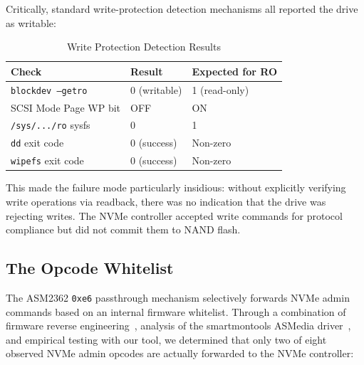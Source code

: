 \documentclass[conference]{IEEEtran}
\begin{document}
Critically, standard write-protection detection mechanisms all reported
the drive as writable:

\begin{table}[ht]
\centering
\caption{Write Protection Detection Results}
\label{tab:wp-detection}
\begin{tabular}{@{}lll@{}}
\toprule
Check & Result & Expected for RO \\
\midrule
\texttt{blockdev --getro} & 0 (writable) & 1 (read-only) \\
SCSI Mode Page WP bit & OFF & ON \\
\texttt{/sys/.../ro} sysfs & 0 & 1 \\
\texttt{dd} exit code & 0 (success) & Non-zero \\
\texttt{wipefs} exit code & 0 (success) & Non-zero \\
\bottomrule
\end{tabular}
\end{table}

This made the failure mode particularly insidious: without explicitly
verifying write operations via readback, there was no indication that
the drive was rejecting writes. The NVMe controller accepted write
commands for protocol compliance but did not commit them to NAND flash.


\subsection{The Opcode Whitelist}
\label{sec:whitelist}

The ASM2362 \texttt{0xe6} passthrough mechanism selectively forwards
NVMe admin commands based on an internal firmware whitelist. Through a
combination of firmware reverse engineering~\cite{cyrozap-usb-pcie},
analysis of the smartmontools ASMedia driver~\cite{smartmontools}, and
empirical testing with our tool, we determined that only two of eight
observed NVMe admin opcodes are actually forwarded to the NVMe
controller:
\end{document}
